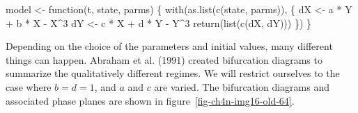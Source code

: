 \documentclass[
  a4paper,
  DIV=11,
  numbers=noendperiod,
  oneside]{scrreprt}
\newenvironment{Shaded}{}{}
\newcommand{\ControlFlowTok}[1]{\textcolor[rgb]{0.84,0.23,0.29}{#1}}
\newcommand{\DecValTok}[1]{\textcolor[rgb]{0.00,0.36,0.77}{#1}}
\newcommand{\FunctionTok}[1]{\textcolor[rgb]{0.44,0.26,0.76}{#1}}
\newcommand{\NormalTok}[1]{\textcolor[rgb]{0.14,0.16,0.18}{#1}}
\newcommand{\OtherTok}[1]{\textcolor[rgb]{0.44,0.26,0.76}{#1}}
\newcommand{\SpecialCharTok}[1]{\textcolor[rgb]{0.00,0.36,0.77}{#1}}
\begin{document}
\begin{Shaded}
\begin{Highlighting}[]
\NormalTok{model }\OtherTok{\textless{}{-}} \ControlFlowTok{function}\NormalTok{(t, state, parms) \{}
  \FunctionTok{with}\NormalTok{(}\FunctionTok{as.list}\NormalTok{(}\FunctionTok{c}\NormalTok{(state, parms)), \{}
\NormalTok{    dX }\OtherTok{\textless{}{-}}\NormalTok{ a }\SpecialCharTok{*}\NormalTok{ Y }\SpecialCharTok{+}\NormalTok{ b }\SpecialCharTok{*}\NormalTok{ X }\SpecialCharTok{{-}}\NormalTok{ X}\SpecialCharTok{\^{}}\DecValTok{3} 
\NormalTok{    dY }\OtherTok{\textless{}{-}}\NormalTok{ c }\SpecialCharTok{*}\NormalTok{ X }\SpecialCharTok{+}\NormalTok{ d }\SpecialCharTok{*}\NormalTok{ Y }\SpecialCharTok{{-}}\NormalTok{ Y}\SpecialCharTok{\^{}}\DecValTok{3}
    \FunctionTok{return}\NormalTok{(}\FunctionTok{list}\NormalTok{(}\FunctionTok{c}\NormalTok{(dX, dY))) }
\NormalTok{  \})}
\NormalTok{\}}
\end{Highlighting}
\end{Shaded}

Depending on the choice of the parameters and initial values, many
different things can happen. Abraham et al. (1991) created bifurcation
diagrams to summarize the qualitatively different regimes. We will
restrict ourselves to the case where \(b = d = 1\), and \(a\) and \(c\)
are varied. The bifurcation diagrams and associated phase planes are
shown in figure~\ref{fig-ch4n-img16-old-64}.
\end{document}
